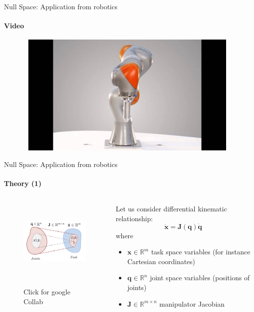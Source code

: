 \documentclass[aspectratio=169]{beamer}
\begin{document}
\begin{frame}[t]{Null Space: Application from robotics}
    \framesubtitle{Video}
    \vspace{-0.6cm}
    \begin{figure}[H]
        \href{https://youtu.be/sZYBC8Lrmdo}{
            \centering\includegraphics[height=6cm,width=1\textwidth,keepaspectratio]{kuka.jpg}}
        \label{fig:kuka.jpg}
    \end{figure}
\end{frame}

\begin{frame}[t]{Null Space: Application from robotics}
\framesubtitle{Theory (1)}
\begin{columns}[T,onlytextwidth]
\begin{column}{0.46\textwidth}
\begin{figure}[H]
    \href{https://colab.research.google.com/drive/1VJGLiDYiWY2EeecCETGjEkZpjaqL8v5e?usp=sharing}{\centering\includegraphics[height=4cm,width=1\textwidth,keepaspectratio]{jacobian_mapping.PNG}}
    \caption{Click for google Collab}
    \label{fig:jacobian_mapping.PNG}
\end{figure}
\end{column}
\begin{column}{0.54\textwidth}
    Let us consider differential kinematic relationship:
    \begin{equation}
        \dot{\boldsymbol{x}} = \mathbf{J}(\mathbf{q})\dot{\mathbf{q}}
    \end{equation}
    where
    \begin{itemize}
        \item   $\boldsymbol{x} \in \mathbb{R}^m$ task space variables (for instance Cartesian coordinates)
        \item   $\mathbf{q} \in \mathbb{R}^n$ joint space variables (positions of joints)
        \item   $\mathbf{J} \in \mathbb{R}^{m\times n}$ manipulator Jacobian
    \end{itemize}
\end{column}
\end{columns}
\end{frame}
\end{document}

